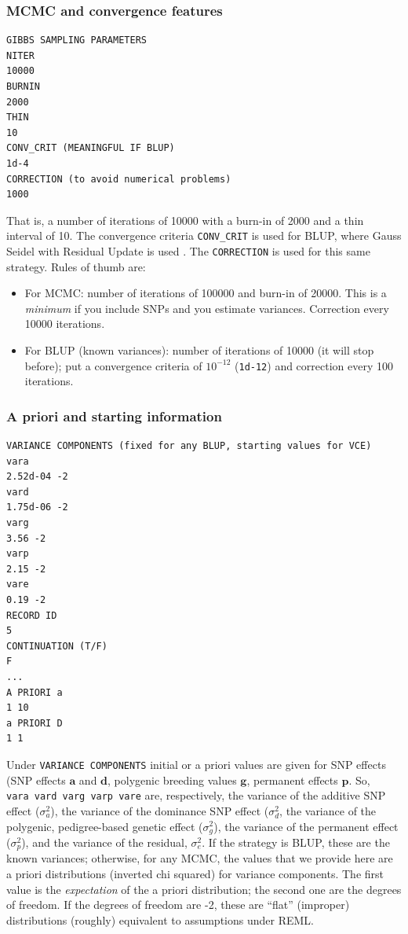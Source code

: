 \documentclass[a4paper,12pt,titlepage]{article}      %
\newcommand{\bsr}{\mathbf} %
\newcommand{\tm}{\texttt} %
\begin{document}
\subsubsection{MCMC and convergence features}

\begin{verbatim}
GIBBS SAMPLING PARAMETERS
NITER
10000
BURNIN
2000
THIN
10
CONV_CRIT (MEANINGFUL IF BLUP)
1d-4
CORRECTION (to avoid numerical problems)
1000
\end{verbatim}

That is, a number of iterations of 10000 with a burn-in of 2000 and a thin interval of 10. The convergence criteria \tm{CONV\_CRIT} is used for BLUP, where Gauss Seidel with Residual Update is used \cite{Legarra2008}. The \tm{CORRECTION} is used for this same strategy.
Rules of thumb are: 
\begin{itemize}
 \item For MCMC: number of iterations of 100000 and burn-in of 20000. This is a \emph{minimum} if you include SNPs and you estimate variances. Correction every 10000 iterations.
 \item For BLUP (known variances): number of iterations of 10000 (it will stop before); put a convergence criteria of $10^{-12}$ (\tm{1d-12}) and correction every 100 iterations.
\end{itemize}

\subsubsection{A priori and starting information}

{\small
\begin{verbatim}
VARIANCE COMPONENTS (fixed for any BLUP, starting values for VCE)
vara
2.52d-04 -2
vard
1.75d-06 -2
varg
3.56 -2
varp
2.15 -2
vare
0.19 -2
RECORD ID
5
CONTINUATION (T/F)
F
...
A PRIORI a
1 10
a PRIORI D
1 1
\end{verbatim}
}

Under \verb|VARIANCE COMPONENTS| initial or a priori values are given for SNP effects (SNP effects $\bsr a$ and $\bsr d$, polygenic breeding values $\bsr g$, permanent effects $\bsr p$. So, \verb| vara vard varg varp vare| are, respectively, the variance of the additive SNP effect ($\sigma^2_a$), the variance of the dominance SNP effect ($\sigma^2_d$, the variance of the polygenic, pedigree-based genetic effect ($\sigma^2_g$), the variance of the permanent effect ($\sigma^2_p$), and the variance of the residual, $\sigma^2_e$. If the strategy is BLUP, these are the known variances; otherwise,  for any MCMC, the values that we provide here are a priori distributions (inverted chi squared) for variance components. The first value is the \emph{expectation} of the a priori distribution; the second one are the degrees of freedom. If the degrees of freedom are -2, these are ``flat'' (improper) distributions (roughly) equivalent to assumptions under REML. 
\end{document}
